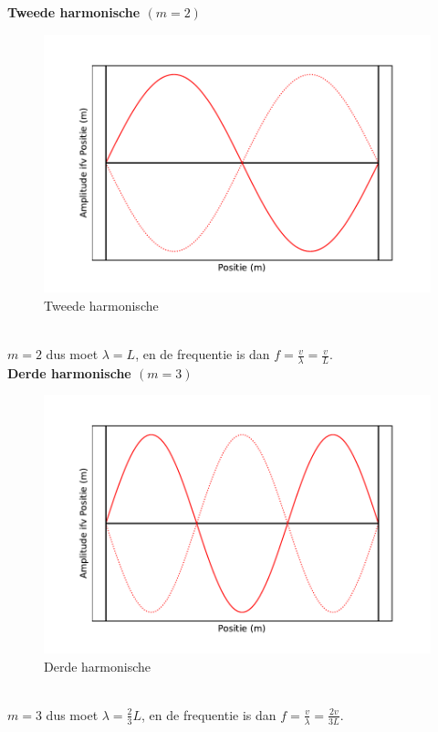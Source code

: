 \documentclass[a4paper,kul]{kulakarticle} %
\begin{document}
\newpage
\textbf{Tweede harmonische $(m = 2)$}\\
\begin{figure}[h]
	\centering
	\includegraphics[width=0.7\linewidth]{Tweede_harm}
	\caption[Tweede harmonische]{Tweede harmonische}
	\label{fig:tweedeharm}
\end{figure}\\
$m = 2$ dus moet $\lambda = L$, en de frequentie is dan $f = \frac{v}{\lambda} = \frac{v}{L}$.\\
\textbf{Derde harmonische $(m = 3)$}\\
\begin{figure}[h]
	\centering
	\includegraphics[width=0.7\linewidth]{Derde_harm}
	\caption[Derde harmonische]{Derde harmonische}
	\label{fig:Derdeharm}
\end{figure}\\
$m = 3$ dus moet $\lambda = \frac{2}{3}L$, en de frequentie is dan $f = \frac{v}{\lambda} = \frac{2v}{3L}$.\\
\newpage
\end{document}
